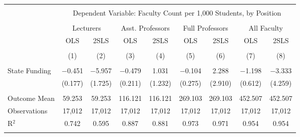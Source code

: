 
\begin{tabular}{@{\extracolsep{5pt}}lcccccccc} 
\\[-1.8ex]\hline 
\hline \\[-1.8ex] 
 & \multicolumn{8}{c}{Dependent Variable: Faculty Count per 1,000 Students, by Position} \\ 
\cline{2-9} 
\\[-1.8ex] & \multicolumn{2}{c}{Lecturers} & \multicolumn{2}{c}{Asst. Professors} & \multicolumn{2}{c}{Full Professors} & \multicolumn{2}{c}{All Faculty} \\ 
 & OLS & 2SLS & OLS & 2SLS & OLS & 2SLS & OLS & 2SLS \\ 
\\[-1.8ex] & (1) & (2) & (3) & (4) & (5) & (6) & (7) & (8)\\ 
\hline \\[-1.8ex] 
 State Funding & $-$0.451 & $-$5.957 & $-$0.479 & 1.031 & $-$0.104 & 2.288 & $-$1.198 & $-$3.333 \\ 
  & (0.177) & (1.725) & (0.211) & (1.232) & (0.275) & (2.910) & (0.612) & (4.259) \\ 
 \hline \\[-1.8ex] 
Outcome Mean & 59.253 & 59.253 & 116.121 & 116.121 & 269.103 & 269.103 & 452.507 & 452.507 \\ 
Observations & 17,012 & 17,012 & 17,012 & 17,012 & 17,012 & 17,012 & 17,012 & 17,012 \\ 
R$^{2}$ & 0.742 & 0.595 & 0.887 & 0.881 & 0.973 & 0.971 & 0.954 & 0.954 \\ 
\hline 
\hline \\[-1.8ex] 
\end{tabular} 
